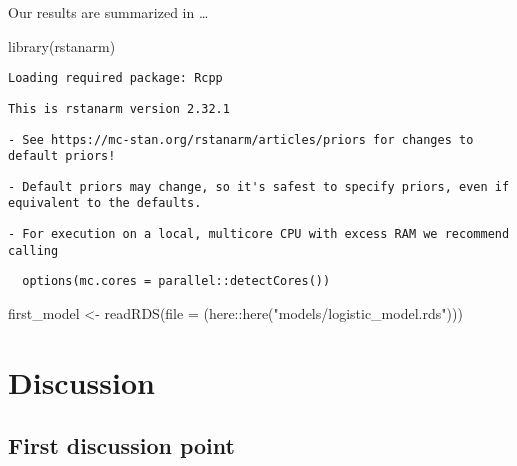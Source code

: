 \documentclass[
  letterpaper,
  DIV=11,
  numbers=noendperiod]{scrartcl}
\newenvironment{Shaded}{\begin{snugshade}}{\end{snugshade}}
\newcommand{\AttributeTok}[1]{\textcolor[rgb]{0.40,0.45,0.13}{#1}}
\newcommand{\FunctionTok}[1]{\textcolor[rgb]{0.28,0.35,0.67}{#1}}
\newcommand{\NormalTok}[1]{\textcolor[rgb]{0.00,0.23,0.31}{#1}}
\newcommand{\OtherTok}[1]{\textcolor[rgb]{0.00,0.23,0.31}{#1}}
\newcommand{\SpecialCharTok}[1]{\textcolor[rgb]{0.37,0.37,0.37}{#1}}
\newcommand{\StringTok}[1]{\textcolor[rgb]{0.13,0.47,0.30}{#1}}
\begin{document}
Our results are summarized in \ldots{}

\begin{Shaded}
\begin{Highlighting}[]
\FunctionTok{library}\NormalTok{(rstanarm)}
\end{Highlighting}
\end{Shaded}

\begin{verbatim}
Loading required package: Rcpp
\end{verbatim}

\begin{verbatim}
This is rstanarm version 2.32.1
\end{verbatim}

\begin{verbatim}
- See https://mc-stan.org/rstanarm/articles/priors for changes to default priors!
\end{verbatim}

\begin{verbatim}
- Default priors may change, so it's safest to specify priors, even if equivalent to the defaults.
\end{verbatim}

\begin{verbatim}
- For execution on a local, multicore CPU with excess RAM we recommend calling
\end{verbatim}

\begin{verbatim}
  options(mc.cores = parallel::detectCores())
\end{verbatim}

\begin{Shaded}
\begin{Highlighting}[]
\NormalTok{first\_model }\OtherTok{\textless{}{-}}
  \FunctionTok{readRDS}\NormalTok{(}\AttributeTok{file =}\NormalTok{ (here}\SpecialCharTok{::}\FunctionTok{here}\NormalTok{(}\StringTok{"models/logistic\_model.rds"}\NormalTok{)))}
\end{Highlighting}
\end{Shaded}

\section{Discussion}\label{discussion}

\subsection{First discussion point}\label{sec-first-point}
\end{document}
